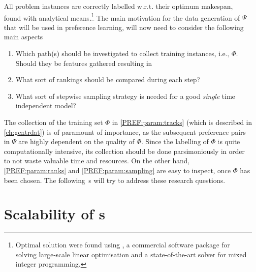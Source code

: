 All problem instances are correctly labelled w.r.t. their optimum makespan, 
found with analytical means.\footnote{Optimal solution were found using 
  \cite{gurobi}, a commercial software package for solving large-scale linear 
  optimisation and a state-of-the-art solver for mixed integer programming.} 
The main motivation for the data generation of $\Psi$ that will be used in 
preference learning, will now need to consider the following main aspects
\begin{enumerate}[after={{}}, leftmargin=*, label={\textbf{PREF.\arabic*}}, 
ref={{PREF.\arabic*}}]
    \item Which path(s) should be investigated to collect training instances, 
    i.e., $\Phi$. Should they be features gathered resulting in
    \label{PREF:param:tracks}
    \item What sort of rankings should be compared during each step?
    \label{PREF:param:ranks}
    \item What sort of stepwise sampling strategy is needed for a good
    \emph{single} time independent model?
    \label{PREF:param:sampling}
\end{enumerate}
The collection of the training set $\Phi$ in \ref{PREF:param:tracks} (which is 
described in \cref{ch:gentrdat}) is of paramount of importance, as the 
subsequent preference pairs in $\Psi$ are highly dependent on the quality of 
$\Phi$. 
Since the labelling of $\Phi$ is quite computationally intensive, its 
collection should be done parsimoniously in order to not waste valuable time 
and resources. 
On the other hand, \ref{PREF:param:ranks} and \ref{PREF:param:sampling} are 
easy to inspect, once $\Phi$ has been chosen.
The following s will try to address these 
research questions. 

\section{Scalability of \dr s}\label{sec:pref:scalability}

